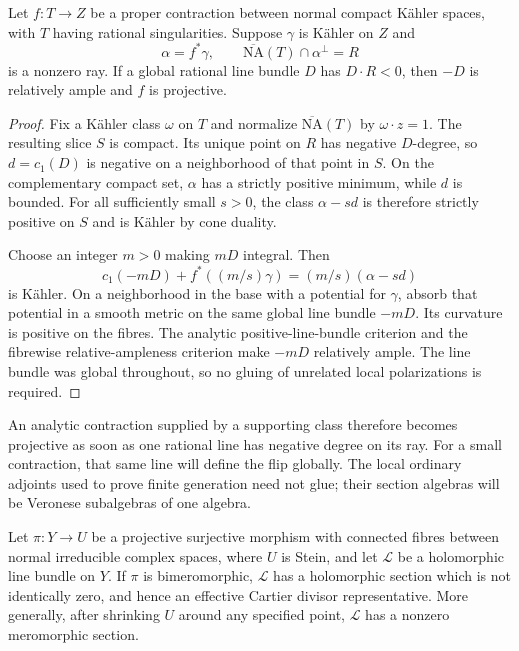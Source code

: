 \begin{lemma}
\label{prog:detected-projectivity}
Let $f:T\to Z$ be a proper contraction between normal compact
K\"ahler spaces, with $T$ having rational singularities. Suppose
$\gamma$ is K\"ahler on $Z$ and
\[
 \alpha=f^*\gamma,\qquad
 \overline{\mathrm{NA}}(T)\cap\alpha^\perp=R
\]
is a nonzero ray. If a global rational line bundle $D$ has
$D\cdot R<0$, then $-D$ is relatively ample and $f$ is projective.
\end{lemma}
\begin{proof}
Fix a K\"ahler class $\omega$ on $T$ and normalize $\overline{\mathrm{NA}}(T)$ by
$\omega\cdot z=1$. The resulting slice $S$ is compact. Its unique
point on $R$ has negative $D$-degree, so $d=c_1(D)$ is negative on
a neighborhood of that point in $S$. On the complementary compact
set, $\alpha$ has a strictly positive minimum, while $d$ is bounded.
For all sufficiently small $s>0$, the class $\alpha-sd$ is therefore
strictly positive on $S$ and is K\"ahler by cone duality.

Choose an integer $m>0$ making $mD$ integral. Then
\[
 c_1(-mD)+f^*((m/s)\gamma)=(m/s)(\alpha-sd)
\]
is K\"ahler. On a neighborhood in the base with a potential for
$\gamma$, absorb that potential in a smooth metric on the same global
line bundle $-mD$. Its curvature is positive on the fibres. The analytic
positive-line-bundle criterion and the fibrewise relative-ampleness
criterion make $-mD$ relatively ample. The line bundle was global
throughout, so no gluing of unrelated local polarizations is required.
\end{proof}


An analytic contraction supplied by a supporting class therefore becomes
projective as soon as one rational line has negative degree on its ray.
For a small contraction, that same line will define the flip globally.
The local ordinary adjoints used to prove finite generation need not
glue; their section algebras will be Veronese subalgebras of one algebra.

\begin{lemma}
\label{prog:stein-representatives}
Let $\pi:Y\to U$ be a projective surjective morphism with connected fibres
between normal irreducible complex spaces, where $U$ is Stein, and let
$\mathcal L$ be a holomorphic line bundle on $Y$.
If $\pi$ is bimeromorphic, $\mathcal L$ has a holomorphic section
which is not identically zero, and hence an effective Cartier divisor
representative. More generally, after shrinking $U$ around any specified
point, $\mathcal L$ has a nonzero meromorphic section.
\end{lemma}

